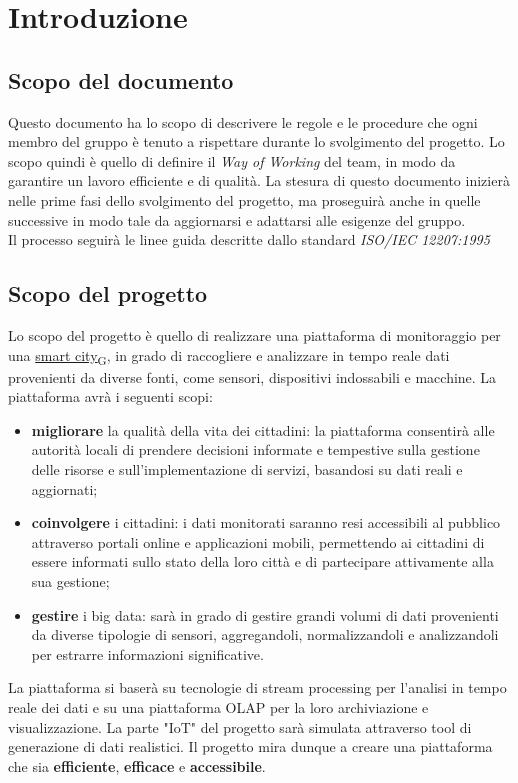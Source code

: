 \section{Introduzione}
\subsection{Scopo del documento}
Questo documento ha lo scopo di descrivere le regole e le procedure che ogni membro del gruppo è tenuto a rispettare durante lo svolgimento del progetto. Lo scopo quindi è quello di definire il \textit{Way of Working} del team, in modo da garantire un lavoro efficiente e di qualità. La stesura di questo documento inizierà nelle prime fasi dello svolgimento del progetto, ma proseguirà anche in quelle successive in modo tale da aggiornarsi e adattarsi alle esigenze del gruppo.\\ 
Il processo seguirà le linee guida descritte dallo standard \textit{ISO/IEC 12207:1995}

\subsection{Scopo del progetto}
Lo scopo del progetto è quello di realizzare una piattaforma di monitoraggio per una \href{https://7last.github.io/docs/rtb/documentazione-interna/glossario\#smart-city}{smart city\textsubscript{G}}, in grado di raccogliere e analizzare in tempo reale dati provenienti da diverse fonti, come sensori, dispositivi indossabili e macchine. La piattaforma avrà i seguenti scopi:
\begin{itemize}
    \item \textbf{migliorare} la qualità della vita dei cittadini: la piattaforma consentirà alle autorità locali di prendere decisioni informate e tempestive sulla gestione delle risorse e sull'implementazione di servizi, basandosi su dati reali e aggiornati;
    \item \textbf{coinvolgere} i cittadini: i dati monitorati saranno resi accessibili al pubblico attraverso portali online e applicazioni mobili, permettendo ai cittadini di essere informati sullo stato della loro città e di partecipare attivamente alla sua gestione;
    \item \textbf{gestire} i big data: sarà in grado di gestire grandi volumi di dati provenienti da diverse tipologie di sensori, aggregandoli, normalizzandoli e analizzandoli per estrarre informazioni significative.
\end{itemize}
La piattaforma si baserà su tecnologie di stream processing per l'analisi in tempo reale dei dati e su una piattaforma OLAP per la loro archiviazione e visualizzazione. La parte "IoT" del progetto sarà simulata attraverso tool di generazione di dati realistici.
Il progetto mira dunque a creare una piattaforma che sia \textbf{efficiente}, \textbf{efficace} e \textbf{accessibile}.

